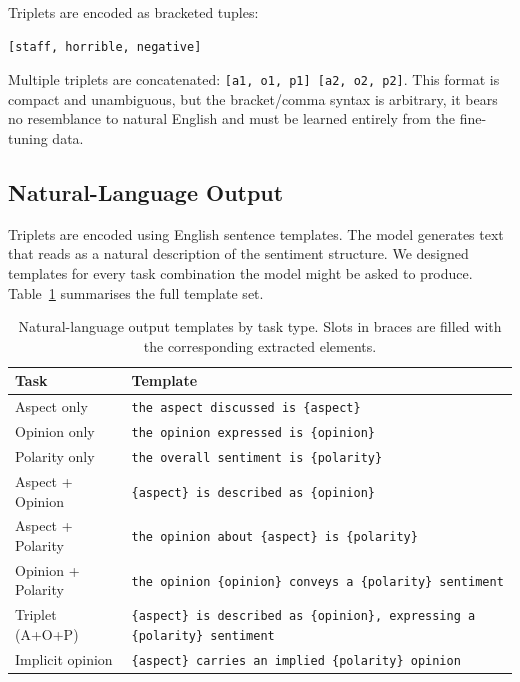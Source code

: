 \documentclass[12pt,a4paper]{report}
\begin{document}
Triplets are encoded as bracketed tuples:

\begin{lstlisting}
[staff, horrible, negative]
\end{lstlisting}

Multiple triplets are concatenated: \texttt{[a1, o1, p1] [a2, o2, p2]}. This format is compact and unambiguous, but the bracket/comma syntax is arbitrary, it bears no resemblance to natural English and must be learned entirely from the fine-tuning data.

\subsection{Natural-Language Output}\label{sec:nl-templates}

Triplets are encoded using English sentence templates. The model generates text that reads as a natural description of the sentiment structure. We designed templates for every task combination the model might be asked to produce. Table~\ref{tab:nl-templates} summarises the full template set.

\begin{table}[H]
\centering
\caption{Natural-language output templates by task type. Slots in braces are filled with the corresponding extracted elements.}
\label{tab:nl-templates}
\small
\begin{tabular}{@{}lp{12cm}@{}}
\toprule
\textbf{Task} & \textbf{Template} \\
\midrule
Aspect only & \texttt{the aspect discussed is \{aspect\}} \\
Opinion only & \texttt{the opinion expressed is \{opinion\}} \\
Polarity only & \texttt{the overall sentiment is \{polarity\}} \\
\midrule
Aspect + Opinion & \texttt{\{aspect\} is described as \{opinion\}} \\
Aspect + Polarity & \texttt{the opinion about \{aspect\} is \{polarity\}} \\
Opinion + Polarity & \texttt{the opinion \{opinion\} conveys a \{polarity\} sentiment} \\
\midrule
Triplet (A+O+P) & \texttt{\{aspect\} is described as \{opinion\}, expressing a \{polarity\} sentiment} \\
\midrule
Implicit opinion & \texttt{\{aspect\} carries an implied \{polarity\} opinion} \\
\bottomrule
\end{tabular}
\end{table}
\end{document}

